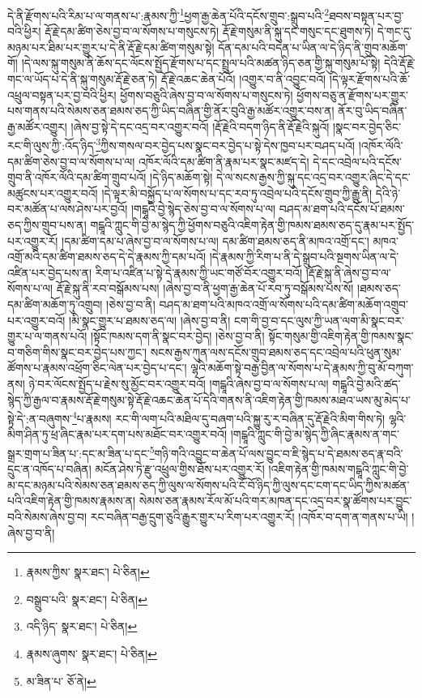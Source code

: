 དེ་ནི་རྫོགས་པའི་རིམ་པ་ལ་གནས་པ་:རྣམས་ཀྱི་\footnote{རྣམས་ཀྱིས་  སྣར་ཐང་།  པེ་ཅིན། }ཕྱག་རྒྱ་ཆེན་པོའི་དངོས་གྲུབ་:སྒྲུབ་པའི་\footnote{བསྒྲུབ་པའི་  སྣར་ཐང་།  པེ་ཅིན། }ཐབས་བསྟན་པར་བྱ་བའི་ཕྱིར། རྡོ་རྗེ་དམ་ཚིག་ཅེས་བྱ་བ་ལ་སོགས་པ་གསུངས་ཏེ། རྡོ་རྗེ་གསུམ་ནི་སྐུ་དང་གསུང་དང་ཐུགས་ཏེ། དེ་གང་དུ་མཉམ་པར་ཐིམ་པར་གྱུར་པ་དེ་ནི་རྡོ་རྗེ་དམ་ཚིག་གསུམ་སྟེ། དོན་དམ་པའི་བདེན་པ་ཡིན་ལ་དེ་ཉིད་ནི་གྲུབ་མཆོག་གོ། །དེ་ལས་སྐུ་གསུམ་ནི་ཆོས་དང་ལོངས་སྤྱོད་རྫོགས་པ་དང་སྤྲུལ་པའི་མཚན་ཉིད་ཅན་གྱི་སྐུ་གསུམ་པོ་སྟེ། དེའི་རྡོ་རྗེ་གང་ལ་ཡོད་པ་དེ་ནི་སྐུ་གསུམ་རྡོ་རྗེ་ཅན་ཏེ། རྡོ་རྗེ་འཆང་ཆེན་པོའོ། །འགྱུར་བ་ནི་འབྱུང་བའོ། །དེ་ལྟར་རྫོགས་པའི་ཆོ་འཕྲུལ་བསྟན་པར་བྱ་བའི་ཕྱིར། ཕྱོགས་བཅུའི་ཞེས་བྱ་བ་ལ་སོགས་པ་གསུངས་ཏེ། ཕྱོགས་བཅུ་ན་རྫོགས་པར་གྱུར་པས་གནས་པའི་སེམས་ཅན་ཐམས་ཅད་ཀྱི་ཡིད་བཞིན་གྱི་ནོར་བུའི་རྒྱ་མཚོར་འགྱུར་བས་ན། ནོར་བུ་ཡིད་བཞིན་རྒྱ་མཚོར་འགྱུར། །ཞེས་བྱ་སྟེ་དེ་དང་འདྲ་བར་འགྱུར་བའོ། །རྡོ་རྗེའི་བདག་ཉིད་ནི་རྡོ་རྗེའི་སྐུའོ། །སྣང་བར་བྱེད་ཅིང་རང་གི་ལུས་ཀྱི་:འོད་ཉིད་\footnote{འདི་ཉིད་  སྣར་ཐང་།  པེ་ཅིན། }ཀྱིས་གསལ་བར་བྱེད་པས་སྣང་བར་བྱེད་པ་སྟེ་དེས་ཁྱབ་པར་བཤད་པའོ། །འཁོར་ལོའི་དམ་ཚིག་ཅེས་བྱ་བ་ལ་སོགས་པ་ལ། འཁོར་ལོའི་དམ་ཚིག་ནི་རྣམ་པར་སྣང་མཛད་དེ། དེ་དང་འབྲེལ་པའི་དངོས་གྲུབ་ནི་འཁོར་ལོའི་དམ་ཚིག་གྲུབ་པའོ། །དེ་ཉིད་མཆོག་སྟེ། དེ་ལ་སངས་རྒྱས་ཀྱི་སྐུ་དང་འདྲ་བར་འགྱུར་ཞིང་དེ་དང་མཚུངས་པར་འགྱུར་བའོ། །དེ་ལྟར་མི་བསྐྱོད་པ་ལ་སོགས་པ་དང་རབ་ཏུ་འབྲེལ་པའི་དངོས་གྲུབ་ཀྱི་རྒྱུ་ནི། དེའི་ཉེ་བར་མཚོན་པ་ལས་ཤེས་པར་བྱའོ། །གངྒཱའི་བྱེ་སྙེད་ཅེས་བྱ་བ་ལ་སོགས་པ་ལ། བཤད་མ་ཐག་པའི་དངོས་པོ་ཐམས་ཅད་ཀྱིས་གྲུབ་པས་ན། གངྒཱའི་ཀླུང་གི་བྱེ་མ་སྙེད་ཀྱི་ཕྱོགས་བཅུའི་འཇིག་རྟེན་གྱི་ཁམས་ཐམས་ཅད་དུ་རྣམ་པར་སྤྱོད་པར་འགྱུར་རོ། །དམ་ཚིག་དམ་པ་ཞེས་བྱ་བ་ལ་སོགས་པ་ལ། དམ་ཚིག་ཐམས་ཅད་ནི་མཁའ་འགྲོ་དང་། མཁའ་འགྲོ་མའི་དམ་ཚིག་ཐམས་ཅད་དེ་དེ་རྣམས་ཀྱི་དམ་པའོ། །དེ་རྣམས་ཀྱི་རིག་པ་ནི་དེ་སྒྲུབ་པའི་སྔགས་ཡིན་ལ་དེ་འཛིན་པར་བྱེད་པས་ན། རིག་པ་འཛིན་པ་སྟེ་དེ་རྣམས་ཀྱི་ཡང་གཙོ་བོར་འགྱུར་བའོ། །རྡོ་རྗེ་སྐུ་ནི་ཞེས་བྱ་བ་ལ་སོགས་པ་ལ། རྡོ་རྗེ་སྐུ་ནི་རབ་བསྒོམས་པས། །ཞེས་བྱ་བ་ནི་ཕྱག་རྒྱ་ཆེན་པོ་རབ་ཏུ་བསྒོམས་པས་སོ། །ཐམས་ཅད་དམ་ཚིག་མཆོག་ཏུ་འགྲུབ། །ཅེས་བྱ་བ་ནི། བཤད་མ་ཐག་པའི་མཁའ་འགྲོ་ལ་སོགས་པའི་དམ་ཚིག་མཆོག་འགྲུབ་པར་འགྱུར་བའོ། །མི་སྣང་གྱུར་པ་ཐམས་ཅད་ལ། །ཞེས་བྱ་བ་ནི། ངག་གི་བྱ་བ་དང་ལུས་ཀྱི་ཡན་ལག་མི་སྣང་བར་གྱུར་པ་ལ་གནས་པའོ། །སྟོང་ཁམས་དག་ནི་སྣང་བར་བྱེད། །ཅེས་བྱ་བ་ནི། སྟོང་གསུམ་གྱི་འཇིག་རྟེན་གྱི་ཁམས་སྣང་བ་གཅིག་གིས་སྣང་བར་བྱེད་པས་ཀྱང་། སངས་རྒྱས་ཀུན་ལས་དངོས་གྲུབ་ཐམས་ཅད་དང་འབྲེལ་པའི་ཕུན་སུམ་ཚོགས་པ་རྣམས་འཕྲོག་ཅིང་ལེན་པར་བྱེད་པ་དང་། ལྷའི་མཆོག་སྟེ་བརྒྱ་བྱིན་ལ་སོགས་པ་དེ་རྣམས་ཀྱི་བུ་མོ་བཀུག་ནས། ཉེ་བར་ལོངས་སྤྱོད་པ་རྗེས་སུ་མྱོང་བར་འགྱུར་བའོ། །གངྒཱའི་ཞེས་བྱ་བ་ལ་སོགས་པ་ལ། གངྒཱའི་བྱེ་མའི་ཚད་སྙེད་ཀྱི་རྒྱལ་བ་རྣམས་རྡོ་རྗེ་གསུམ་སྟེ་རྡོ་རྗེ་འཆང་ཆེན་པོ་དེའི་གནས་ནི་འཇིག་རྟེན་གྱི་ཁམས་མཐའ་ཡས་མུ་མེད་པ་སྟེ་དེ་:ན་བཞུགས་\footnote{རྣམས་ཞུགས་  སྣར་ཐང་།  པེ་ཅིན། }པ་རྣམས། རང་གི་ལག་པའི་མཐིལ་དུ་བཞག་པའི་སྐྱུ་རུ་ར་བཞིན་དུ་རྡོ་རྗེའི་མིག་གིས་ཏེ། ལྷའི་མིག་ཤིན་ཏུ་ཕྲ་ཞིང་རྣམ་པར་དག་པས་མཐོང་བར་འགྱུར་བའོ། །གངྒཱའི་ཀླུང་གི་བྱེ་མ་སྙེད་ཀྱི་ཞིང་རྣམས་ན་གང་སྒྲར་གྲག་པ་ཟིན་པ་:དང་མ་ཟིན་པ་དང་\footnote{མ་ཟིན་པ་  ཅོ་ནེ། }གཉི་གའི་འབྱུང་བ་ཆེན་པོ་ལས་བྱུང་བ་ཇི་སྙེད་པ་དེ་ཐམས་ཅད་རྣ་བའི་དྲུང་ན་འཁོད་པ་བཞིན། མངོན་ཤེས་ཏེ་རྫུ་འཕྲུལ་གྱིས་ཐོས་པར་འགྱུར་རོ། །འཇིག་རྟེན་གྱི་ཁམས་གངྒཱའི་ཀླུང་གི་བྱེ་མ་དང་མཉམ་པའི་སེམས་ཅན་ཐམས་ཅད་ཀྱི་ལུས་ལ་སོགས་པའི་ངོ་བོ་ཉིད་ཀྱི་ལུས་དང་ངག་དང་ཡིད་ཀྱིས་མཚན་པའི་འཇིག་རྟེན་གྱི་ཁམས་རྣམས་ན། སེམས་ཅན་རྣམས་རོལ་མོ་པའི་གར་མཁན་དང་འདྲ་བར་སྣ་ཚོགས་པར་བྱུང་བའི་སེམས་ཞེས་བྱ་བ། རང་བཞིན་བརྒྱ་དྲུག་ཅུའི་རྒྱུར་གྱུར་པ་རིག་པར་འགྱུར་རོ། །འཁོར་བ་དག་ན་གནས་པ་ཡི། །ཞེས་བྱ་བ་ནི། 